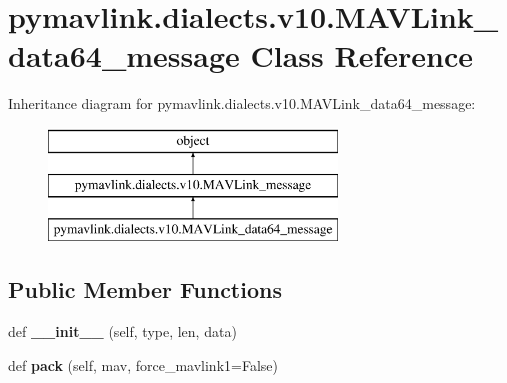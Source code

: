\hypertarget{classpymavlink_1_1dialects_1_1v10_1_1MAVLink__data64__message}{}\section{pymavlink.\+dialects.\+v10.\+M\+A\+V\+Link\+\_\+data64\+\_\+message Class Reference}
\label{classpymavlink_1_1dialects_1_1v10_1_1MAVLink__data64__message}
Inheritance diagram for pymavlink.\+dialects.\+v10.\+M\+A\+V\+Link\+\_\+data64\+\_\+message\+:\begin{figure}[H]
\begin{center}
\leavevmode
\includegraphics[height=3.000000cm]{classpymavlink_1_1dialects_1_1v10_1_1MAVLink__data64__message}
\end{center}
\end{figure}
\subsection*{Public Member Functions}
\begin{DoxyCompactItemize}
\item 
\mbox{\label{classpymavlink_1_1dialects_1_1v10_1_1MAVLink__data64__message_a580cf8c48f2c2fbfc64a053c977dcc5a}} 
def {\bfseries \+\_\+\+\_\+init\+\_\+\+\_\+} (self, type, len, data)
\item 
\mbox{\label{classpymavlink_1_1dialects_1_1v10_1_1MAVLink__data64__message_aea1853cf3f238c4a9832e258d147470a}} 
def {\bfseries pack} (self, mav, force\+\_\+mavlink1=False)
\end{DoxyCompactItemize}
